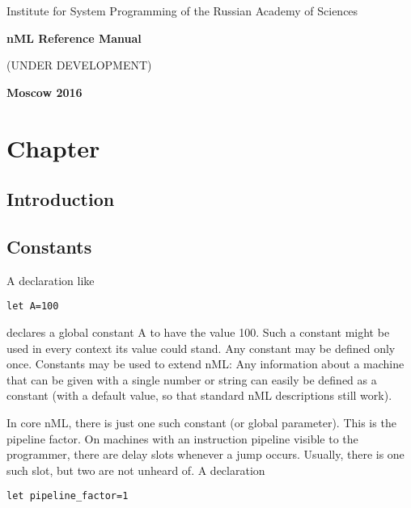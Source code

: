 \documentclass[oneside,final,14pt]{extreport}
\begin{document}
\begin{titlepage}
\begin{center}
\Large{Institute for System Programming of the Russian Academy of Sciences}

\vfill


\bf\Large{nML Reference Manual}

(UNDER DEVELOPMENT)

\vfill

\bf
Moscow 2016
\end{center}


\end{titlepage}

\newpage
{} %
\tableofcontents

\newpage


\chapter{Chapter}

\section{Introduction}

\section{Constants}

A declaration like

\begin{lstlisting}
let A=100
\end{lstlisting}

declares a global constant A to have the value 100. Such a constant might be used in every context
its value could stand. Any constant may be defined only once. Constants may be used to extend nML:
Any information about a machine that can be given with a single number or string can easily be
defined as a constant (with a default value, so that standard nML descriptions still work).

In core nML, there is just one such constant (or global parameter).
This is the pipeline factor. On machines with an instruction pipeline visible to the programmer,
there are delay slots whenever a jump occurs. Usually, there is one such slot, but two are not
unheard of. A declaration

\begin{lstlisting}
let pipeline_factor=1
\end{lstlisting}
\end{document}
